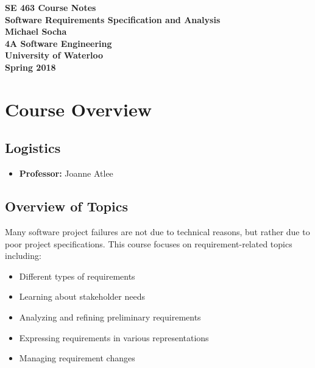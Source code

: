 \documentclass[12pt,titlepage]{article}
\begin{document}
  \begin{titlepage}
    \vspace*{\fill}
    \centering

    \textbf{\Huge SE 463 Course Notes} \\ [0.4em]
    \textbf{\Large Software Requirements Specification and Analysis} \\ [1em]
    \textbf{\Large Michael Socha} \\ [1em]
    \textbf{\large 4A Software Engineering} \\
    \textbf{\large University of Waterloo} \\
    \textbf{\large Spring 2018} \\
    \vspace*{\fill}
  \end{titlepage}

  \newpage 


  \tableofcontents

  \newpage


  \section{Course Overview}
    \subsection{Logistics}
      \begin{itemize}
        \item \textbf{Professor:} Joanne Atlee
      \end{itemize}

    \subsection{Overview of Topics}
      Many software project failures are not due to technical reasons, but rather due to poor project specifications. This course
      focuses on requirement-related topics including:
      \begin{itemize}
        \item Different types of requirements
        \item Learning about stakeholder needs
        \item Analyzing and refining preliminary requirements
        \item Expressing requirements in various representations
        \item Managing requirement changes
      \end{itemize}
\end{document}
